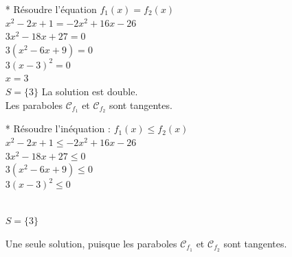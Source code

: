 \begin{enumerate}
\begin{enumerate}
\begin{itemize}
\item [*] Résoudre l'équation $f_1(x) = f_2(x)$\\

$  x^2 -2x +1 = -2x^2 +16x -26 $\\
$  3x^2 -18x +27 = 0 $\\
$  3(x^2 -6x +9) = 0 $\\
$  3(x - 3)^2 = 0 $ \\
$ x = 3 $ \\

$S=\{3\}$ La solution est double. \\
               
Les paraboles $\mathcal{C}_{f_1}$ et $\mathcal{C}_{f_2}$ sont tangentes.
             
\item [*] Résoudre l'inéquation : $f_1(x) \leqslant f_2(x)$\\

$  x^2 -2x +1    \leqslant -2x^2 +16x -26 $\\
$  3x^2 -18x +27 \leqslant 0 $\\
$  3(x^2 -6x +9) \leqslant 0 $\\
$  3(x - 3)^2    \leqslant 0 $ \\


 \\

$S = \{3\}$ 

Une seule solution, puisque  les paraboles $\mathcal{C}_{f_1}$ et $\mathcal{C}_{f_2}$ sont tangentes.

\end{itemize}

\end{enumerate}

\end{enumerate}


